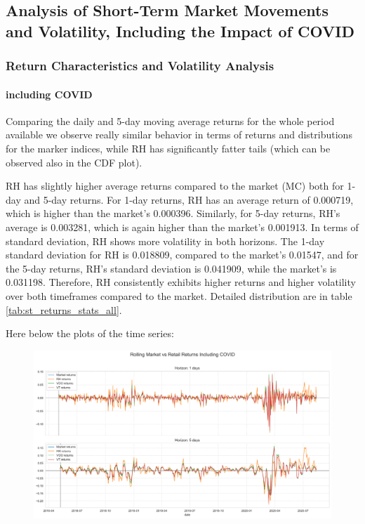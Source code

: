 \subsection{Analysis of Short-Term Market Movements and Volatility, Including the Impact of COVID}

\subsubsection{Return Characteristics and Volatility Analysis}
\paragraph{including COVID}
Comparing the daily and 5-day moving average returns for the whole period available we observe really similar behavior in terms of returns and distributions for the marker indices,
while RH has significantly fatter tails (which can be observed also in the CDF plot).

RH has slightly higher average returns compared to the market (MC) both for 1-day and 5-day returns. For 1-day returns, RH has an average return of 0.000719, which is higher than the market's 0.000396. 
Similarly, for 5-day returns, RH's average is 0.003281, which is again  higher than the market's 0.001913. 
In terms of standard deviation, RH shows more volatility in both horizons. 
The 1-day standard deviation for RH is 0.018809, compared to the market's 0.01547, and for the 5-day returns, RH's standard deviation is 0.041909, while the market's is 0.031198. 
Therefore, RH consistently exhibits higher returns and higher volatility over both timeframes compared to the market. Detailed distribution are in table \ref{tab:st_returns_stats_all}.

Here below the plots of the time series:
\begin{figure}[H]
    \centering
    \includegraphics[width=1\linewidth]{../images/ts_including_1_5.png}
\end{figure}


